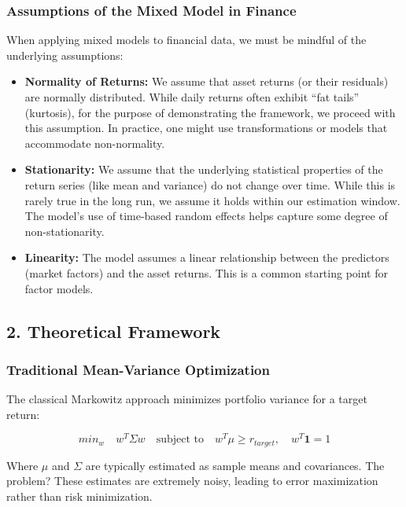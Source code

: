 \documentclass[
]{article}
\providecommand{\tightlist}{%
  \setlength{\itemsep}{0pt}\setlength{\parskip}{0pt}}
\begin{document}
\subsubsection{Assumptions of the Mixed Model in
Finance}\label{assumptions-of-the-mixed-model-in-finance}

When applying mixed models to financial data, we must be mindful of the
underlying assumptions:

\begin{itemize}
\tightlist
\item
  \textbf{Normality of Returns:} We assume that asset returns (or their
  residuals) are normally distributed. While daily returns often exhibit
  ``fat tails'' (kurtosis), for the purpose of demonstrating the
  framework, we proceed with this assumption. In practice, one might use
  transformations or models that accommodate non-normality.
\item
  \textbf{Stationarity:} We assume that the underlying statistical
  properties of the return series (like mean and variance) do not change
  over time. While this is rarely true in the long run, we assume it
  holds within our estimation window. The model's use of time-based
  random effects helps capture some degree of non-stationarity.
\item
  \textbf{Linearity:} The model assumes a linear relationship between
  the predictors (market factors) and the asset returns. This is a
  common starting point for factor models.
\end{itemize}

\subsection{2. Theoretical Framework}\label{theoretical-framework}

\subsubsection{Traditional Mean-Variance
Optimization}\label{traditional-mean-variance-optimization}

The classical Markowitz approach minimizes portfolio variance for a
target return:

\[min_{w} \quad w^T \Sigma w \quad \text{subject to} \quad w^T \mu \geq r_{target}, \quad w^T \mathbf{1} = 1\]

Where \(\mu\) and \(\Sigma\) are typically estimated as sample means and
covariances. The problem? These estimates are extremely noisy, leading
to error maximization rather than risk minimization.
\end{document}
